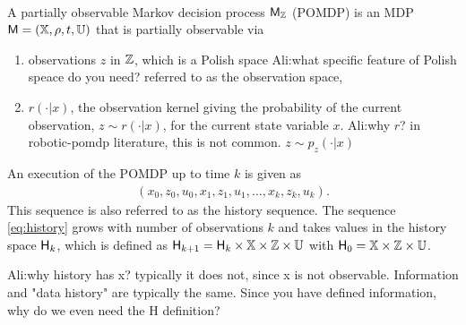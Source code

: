 \documentclass{ifacconf}
\renewcommand{\axx}[1]{{\color{orange} Ali:#1}}
\begin{document}
\begin{definition} \label{def:MDP}\mbox{ }\\
A partially observable Markov decision process $\mathsf{M}_{{\mathbb{Z}}}$ (POMDP) is an MDP $\mathsf{M} = ({\mathbb{X}}, \rho, t, {\mathbb{U}})$  that is partially observable via  
\begin{enumerate}
	\item observations $z$ in ${\mathbb{Z}}$,  which is a Polish space \axx{what specific feature of Polish speace do you need?} referred to as the observation space, %
\item $r(\cdot|x)$,  the observation kernel giving the probability of the current observation,  $z\sim r(\cdot|x)$,  for the current state variable $x$.
\axx{why $r$? in robotic-pomdp literature, this is not common.  $z\sim p_z(\cdot|x)$}
\end{enumerate}


\end{definition} 

An execution of the POMDP  up to time $k$ is given as
\begin{align}\label{eq:history} (x_0,z_0,u_0,x_1,z_1,u_1,\ldots,x_k,z_k,u_k).\end{align}
This sequence is also referred to as the history sequence.
The sequence  \eqref{eq:history} grows with number of observations  $k$ and takes values in the history space ${\mathsf{H}}_k$, which is defined as
  ${\mathsf{H}}_{k+1}={\mathsf{H}}_{k}\times{\mathbb{X}}\times{\mathbb{Z}}\times {\mathbb{U}}$ with ${\mathsf{H}}_0={\mathbb{X}}\times{\mathbb{Z}}\times {\mathbb{U}}$.
  
  \axx{why history has x? typically it does not, since x is not observable. Information and "data history" are typically the same. Since you have defined information, why do we even need the H definition?}
  
\end{document}

